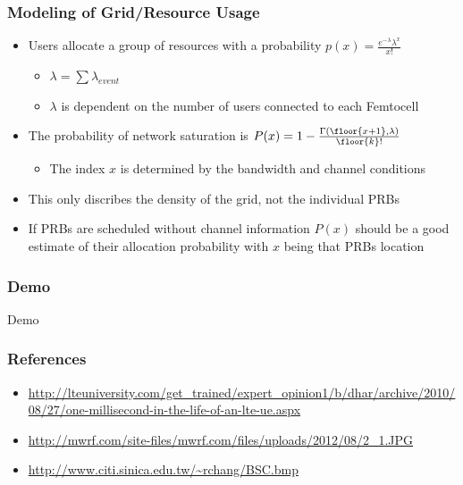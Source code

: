 \documentclass{beamer}
\begin{document}
\begin{frame}
\frametitle{Modeling of Grid/Resource Usage}
\begin{itemize}
  \item Users allocate a group of resources with a probability $p\left( x \right) = \frac{{e^{ - \lambda } \lambda ^x }}{{x!}}$
  \begin{itemize}
    \item $\lambda = \sum\lambda_{event}$
    \item $\lambda$ is dependent on the number of users connected to each Femtocell
  \end{itemize}
  \item The probability of network saturation is $P(x) = 1 - \frac{\Gamma (\floor{x+1},\lambda)}{\floor{k}!}$
  \begin{itemize}
    \item The index $x$ is determined by the bandwidth and channel conditions
  \end{itemize}
  \item This only discribes the density of the grid, not the individual PRBs
  \item If PRBs are scheduled without channel information $P(x)$ should be a good estimate of their allocation probability with $x$ being that PRBs location
\end{itemize}
\end{frame}


\begin{frame}
\frametitle{Demo}
\Huge{\centerline{Demo}}
\end{frame}


\begin{frame}
\frametitle{References}
\begin{itemize}
\item \url{http://lteuniversity.com/get_trained/expert_opinion1/b/dhar/archive/2010/08/27/one-millisecond-in-the-life-of-an-lte-ue.aspx}
\item \url{http://mwrf.com/site-files/mwrf.com/files/uploads/2012/08/2_1.JPG}
\item \url{http://www.citi.sinica.edu.tw/~rchang/BSC.bmp}
\end{itemize}
\end{frame}

\end{document}

